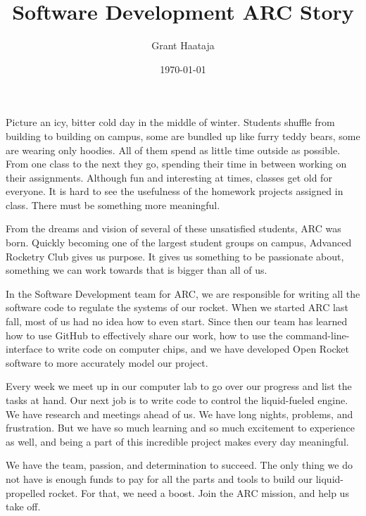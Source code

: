 \documentclass[11pt,final,twoside]{article} %
\title{Software Development ARC Story}
\author{Grant Haataja}
\date{\today}
\begin{document}
	\maketitle

Picture an icy, bitter cold day in the middle of winter. Students shuffle from building to building on campus, some are bundled up like furry teddy bears, some are wearing only hoodies. All of them spend as little time outside as possible. From one class to the next they go, spending their time in between working on their assignments. Although fun and interesting at times, classes get old for everyone. It is hard to see the usefulness of the homework projects assigned in class. There must be something more meaningful.

From the dreams and vision of several of these unsatisfied students, ARC was born. Quickly becoming one of the largest student groups on campus, Advanced Rocketry Club gives us purpose. It gives us something to be passionate about, something we can work towards that is bigger than all of us. 

In the Software Development team for ARC, we are responsible for writing all the software code to regulate the systems of our rocket. When we started ARC last fall, most of us had no idea how to even start. Since then our team has learned how to use GitHub to effectively share our work, how to use the command-line-interface to write code on computer chips, and we have developed Open Rocket software to more accurately model our project. 

Every week we meet up in our computer lab to go over our progress and list the tasks at hand. Our next job is to write code to control the liquid-fueled engine. We have research and meetings ahead of us. We have long nights, problems, and frustration. But we have so much learning and so much excitement to experience as well, and being a part of this incredible project makes every day meaningful.

We have the team, passion, and determination to succeed. The only thing we do not have is enough funds to pay for all the parts and tools to build our liquid-propelled rocket. For that, we need a boost. Join the ARC mission, and help us take off. 
\end{document}
